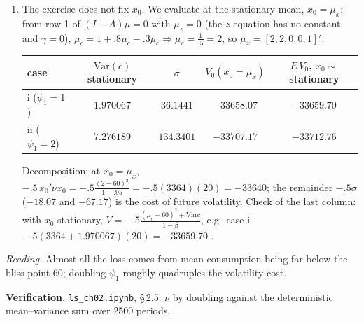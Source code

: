 \documentclass[12pt, letterpaper]{article}
\newcommand{\Var}{\mathrm{Var}}
\newcommand{\nb}[1]{\texttt{ls\_ch02.ipynb}, \S\,#1}
\begin{document}
\begin{tcolorbox}[oddbox,title={Exercise 2.5 \quad Value of a Consumption Process}]
\begin{enumerate}
\item The exercise does not fix $x_0$. We evaluate at the stationary mean,
$x_0=\mu_x$: from row 1 of $(I-A)\mu=0$ with $\mu_z=0$ (the $z$ equation has no constant and
$\gamma=0$), $\mu_c=1+.8\mu_c-.3\mu_c\Rightarrow\mu_c=\frac{1}{.5}=2$, so $\mu_x=[2,2,0,0,1]'$.

\begin{center}\small
\begin{tabular}{@{}lcccc@{}}
\toprule
case & $\Var(c)$ stationary & $\sigma$ & $V_0(x_0=\mu_x)$ & $E\,V_0$, $x_0\sim$ stationary\\
\midrule
i ($\psi_1=1$) & $1.970067$ & $36.1441$ & $\boxed{-33658.07}$ & $-33659.70$\\
ii ($\psi_1=2$) & $7.276189$ & $134.3401$ & $\boxed{-33707.17}$ & $-33712.76$\\
\bottomrule
\end{tabular}
\end{center}
Decomposition: at $x_0=\mu_x$, $-.5\,x_0'\nu x_0=-.5\frac{(2-60)^2}{1-.95}=-.5(3364)(20)=-33640$;
the remainder $-.5\sigma$ ($-18.07$ and $-67.17$) is the cost of future volatility. Check of the last
column: with $x_0$ stationary, $V=-.5\frac{(\mu_c-60)^2+\Var c}{1-\beta}$, e.g.\ case i
$-.5(3364+1.970067)(20)=-33659.70$ \checkmark.
\end{enumerate}
\emph{Reading.} Almost all the loss comes from mean consumption being far below the bliss point 60;
doubling $\psi_1$ roughly quadruples the volatility cost.

\textbf{Verification.} \nb{2.5}: $\nu$ by doubling against the deterministic mean--variance sum
over 2500 periods. \checkmark
\end{tcolorbox}
\end{document}
